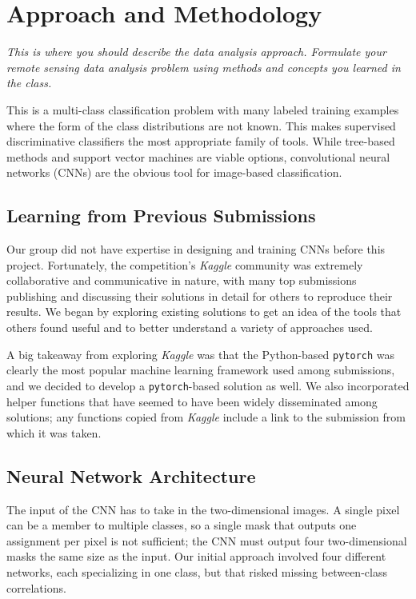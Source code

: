 \section{Approach and Methodology}
\textit{This is where you should describe the data analysis approach. Formulate your remote sensing data analysis problem using methods and concepts you learned in the class. }

This is a multi-class classification problem with many labeled training examples where the form of the class distributions are not known. This makes supervised discriminative classifiers the most appropriate family of tools. While tree-based methods and support vector machines are viable options, convolutional neural networks (CNNs) are the obvious tool for image-based classification.

\subsection*{Learning from Previous Submissions}
Our group did not have expertise in designing and training CNNs before this project. Fortunately, the competition's \textit{Kaggle} community was extremely collaborative and communicative in nature, with many top submissions publishing and discussing their solutions in detail for others to reproduce their results. We began by exploring existing solutions to get an idea of the tools that others found useful and to better understand a variety of approaches used. 

A big takeaway from exploring \textit{Kaggle} was that the Python-based \texttt{pytorch} was clearly the most popular machine learning framework used among submissions, and we decided to develop a \texttt{pytorch}-based solution as well. We also incorporated helper functions that have seemed to have been widely disseminated among solutions; any functions copied from \textit{Kaggle} include a link to the submission from which it was taken. 

\subsection*{Neural Network Architecture}
The input of the CNN has to take in the two-dimensional images. A single pixel can be a member to multiple classes, so a single mask that outputs one assignment per pixel is not sufficient; the CNN must output four two-dimensional masks the same size as the input. Our initial approach involved four different networks, each specializing in one class, but that risked missing between-class correlations. 

